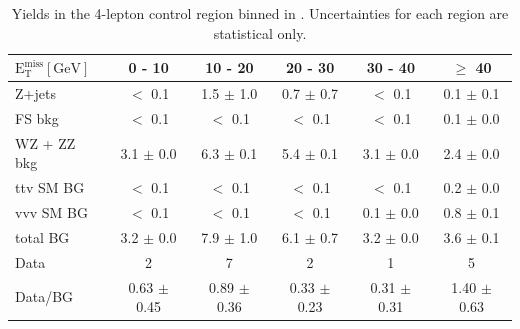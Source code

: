 \begin{table}[htb]
  \scriptsize
  \begin{center}
    \caption{\label{tab:met_CR4lep} 
      Yields in the 4-lepton control region binned in \MET. Uncertainties for each region are statistical only. 
    }
    \begin{tabular}{l|c|c|c|c|c}
      \hline
      \hline
      $\mathrm{E_{T}^{miss} [GeV]}$ &0 - 10 & 10 - 20 & 20 - 30 & 30 - 40 & $\geq$ 40 \\
      \hline 
      Z+jets&  $<$ 0.1 &  1.5 $\pm$ 1.0 &  0.7 $\pm$ 0.7 &  $<$ 0.1 &  0.1 $\pm$ 0.1 \\ 
      FS bkg&  $<$ 0.1 &  $<$ 0.1 &  $<$ 0.1 &  $<$ 0.1 &  0.1 $\pm$ 0.0 \\ 
      WZ + ZZ bkg&  3.1 $\pm$ 0.0 &  6.3 $\pm$ 0.1 &  5.4 $\pm$ 0.1 &  3.1 $\pm$ 0.0 &  2.4 $\pm$ 0.0 \\ 
      ttv SM BG&  $<$ 0.1 &  $<$ 0.1 &  $<$ 0.1 &  $<$ 0.1 &  0.2 $\pm$ 0.0 \\ 
      vvv SM BG&  $<$ 0.1 &  $<$ 0.1 &  $<$ 0.1 &  0.1 $\pm$ 0.0 &  0.8 $\pm$ 0.1 \\ 
      \hline 
      total BG&  3.2 $\pm$ 0.0 &  7.9 $\pm$ 1.0 &  6.1 $\pm$ 0.7 &  3.2 $\pm$ 0.0 &  3.6 $\pm$ 0.1 \\ 
      \hline 
      Data&  2 &  7 &  2 &  1 &  5 \\ 
      \hline 
      Data/BG&  0.63 $\pm$ 0.45 &  0.89 $\pm$ 0.36 &  0.33 $\pm$ 0.23 &  0.31 $\pm$ 0.31 &  1.40 $\pm$ 0.63 \\ 
      \hline
      \hline
    \end{tabular}
  \end{center}
\end{table}



